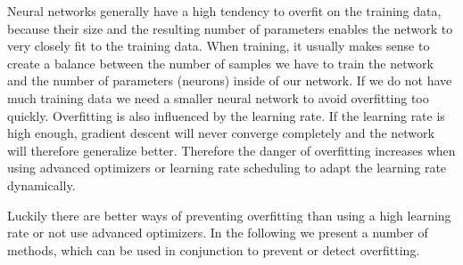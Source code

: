 
Neural networks generally have a high tendency to overfit on the training data, because their size and the resulting number of parameters enables the network to very closely fit to the training data. When training, it usually makes sense to create a balance between the number of samples we have to train the network and the number of parameters (neurons) inside of our network. If we do not have much training data we need a smaller neural network to avoid overfitting too quickly. Overfitting is also influenced by the learning rate. If the learning rate is high enough, gradient descent will never converge completely and the network will therefore generalize better. Therefore the danger of overfitting increases when using advanced optimizers or learning rate scheduling to adapt the learning rate dynamically.

Luckily there are better ways of preventing overfitting than using a high learning rate or not use advanced optimizers. In the following we present a number of methods, which can be used in conjunction to prevent or detect overfitting.

